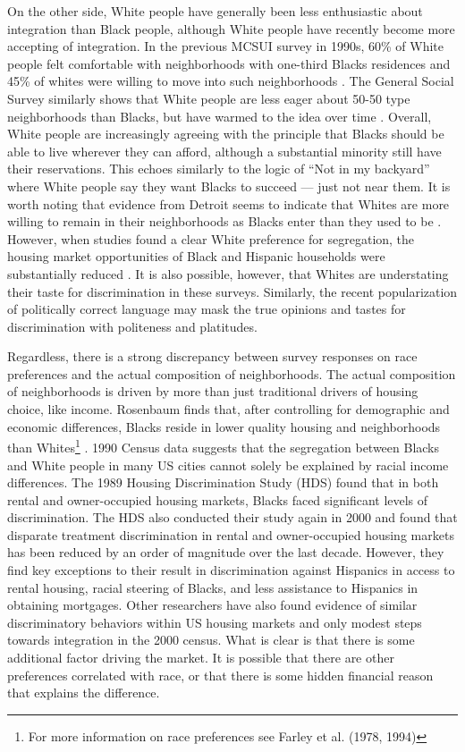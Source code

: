 {On the other side, White people have generally been less enthusiastic about integration than Black people, although White people have recently become more accepting of integration. In the previous MCSUI survey in 1990s, 60\% of White people felt comfortable with neighborhoods with one-third Blacks residences and 45\% of whites were willing to move into such neighborhoods \cite{charles03}. The General Social Survey similarly shows that White people are less eager about 50-50 type neighborhoods than Blacks, but have warmed to the idea over time \cite{schuman97}. Overall, White people are increasingly agreeing with the principle that Blacks should be able to live wherever they can afford, although a substantial minority still have their reservations\cite{schuman97,bobo01}. This echoes similarly to the logic of ``Not in my backyard'' where White people say they want Blacks to succeed --- just not near them. It is worth noting that evidence from Detroit seems to indicate that Whites are more willing to remain in their neighborhoods as Blacks enter than they used to be \cite{farley94}. However, when studies found a clear White preference for segregation, the housing market opportunities of Black and Hispanic households were substantially reduced \cite{farley94,bobo96,charles00}. It is also possible, however, that Whites are understating their taste for discrimination in these surveys. Similarly, the recent popularization of politically correct language may mask the true opinions and tastes for discrimination with politeness and platitudes.

Regardless, there is a strong discrepancy between survey responses on race preferences and the actual composition of neighborhoods. The actual composition of neighborhoods is driven by more than just traditional drivers of housing choice, like income. Rosenbaum finds that, after controlling for demographic and economic differences, Blacks reside in lower quality housing and neighborhoods than Whites\footnote{For more information on race preferences see Farley et al. (1978, 1994)\cite{farley78,farley94,farley94b}} \cite{rosenbaum99}. 1990 Census data suggests that the segregation between Blacks and White people in many US cities cannot solely be explained by racial income differences\cite{massey93}. The 1989 Housing Discrimination Study (HDS) found that in both rental and owner-occupied housing markets, Blacks faced significant levels of discrimination\cite{yinger95}. The HDS also conducted their study again in 2000 and found that disparate treatment discrimination in rental and owner-occupied housing markets has been reduced by an order of magnitude over the last decade. However, they find key exceptions to their result in discrimination against Hispanics in access to rental housing, racial steering of Blacks, and less assistance to Hispanics in obtaining mortgages. Other researchers have also found evidence of similar discriminatory behaviors within US housing markets and only modest steps towards integration in the 2000 census\cite{glaeser00,ross05a,turner05}. What is clear is that there is some additional factor driving the market. It is possible that there are other preferences correlated with race, or that there is some hidden financial reason that explains the difference. 

}
